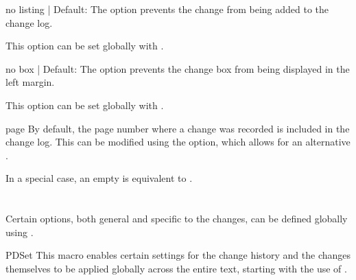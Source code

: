 \documentclass[11pt]{article}
\begin{document}
\begin{PDListing}
\end{PDListing}


\begin{Optiondef}{no listing}{ | }{Default: }
    The  option prevents the change from being added to the change log.

    This option can be set globally with .
\end{Optiondef}

\begin{PDListing}
\end{PDListing}

\begin{Optiondef}{no box}{ | }{Default: }
    The  option prevents the change box from being displayed in the left margin.

    This option can be set globally with .
\end{Optiondef}

\begin{Optiondef}{page}{}{}
    By default, the page number where a change was recorded is included in the change log. This can be modified using the  option, which allows for an alternative .

    In a special case, an empty  is equivalent to .
\end{Optiondef}

\begin{PDListing}
\end{PDListing}


\section{}

Certain options, both general and specific to the changes, can be defined globally using .

\begin{Macrodef}{PDSet}{}{}
    This macro enables certain settings for the change history and the changes themselves to be applied globally across the entire text, starting with the use of .
\end{Macrodef}
\end{document}
